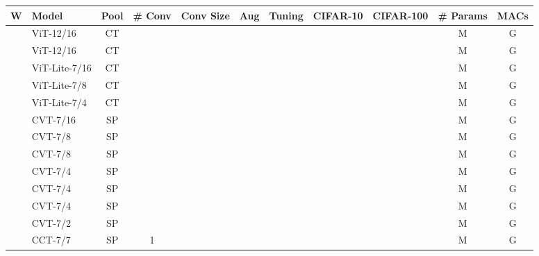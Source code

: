 \documentclass[10pt,twocolumn,letterpaper]{article}
\newcommand{\cmark}{\ding{51}}
\newcommand{\xmark}{\ding{55}}
\begin{document}
\begin{table*}[t]
    \centering
    \begin{tabular}{clccccc|cc|cc}
        \toprule
        W & Model & Pool & \# Conv & Conv Size & Aug & Tuning & CIFAR-10 & CIFAR-100 & \# Params & MACs\\
        \midrule
        \xmark & ViT-12/16 & CT & \xmark & \xmark & \xmark & \xmark &  &  &  M &  G \\
        
        \cmark & ViT-12/16 & CT & \xmark & \xmark & \xmark & \xmark &  &  &  M &  G \\
        \midrule
        
        \cmark & ViT-Lite-7/16 & CT & \xmark & \xmark & \xmark & \xmark &  &  &  M &  G \\
        
        \cmark & ViT-Lite-7/8 & CT & \xmark & \xmark & \xmark & \xmark &  &  &  M &  G \\
        
        \cmark & ViT-Lite-7/4 & CT & \xmark & \xmark & \xmark & \xmark &  &  &  M &  G \\
        
        \midrule
        
        \cmark & CVT-7/16 & SP & \xmark & \xmark & \xmark & \xmark &  &  &  M &  G \\
        
        \cmark & CVT-7/8 & SP & \xmark & \xmark & \xmark & \xmark &  &  &  M &  G \\
        
        \cmark & CVT-7/8 & SP & \xmark & \xmark & \cmark & \xmark &  &  &  M &  G \\
        
        \cmark & CVT-7/4 & SP & \xmark & \xmark & \xmark & \xmark &  &  &  M &  G \\
        
        \cmark & CVT-7/4 & SP & \xmark & \xmark & \cmark & \xmark &  &  &  M &  G \\
        
        \cmark & CVT-7/4 & SP & \xmark & \xmark & \cmark & \cmark &  &  &  M &  G \\
        
        \cmark & CVT-7/2 & SP & \xmark & \xmark & \xmark & \xmark &  &  &  M &  G \\
        
        \midrule
        
        \cmark & CCT-7/7\texttimes1 & SP & 1 &  & \xmark & \xmark &  &  &  M &  G \\
        

\end{tabular}
\end{table*}
\end{document}
